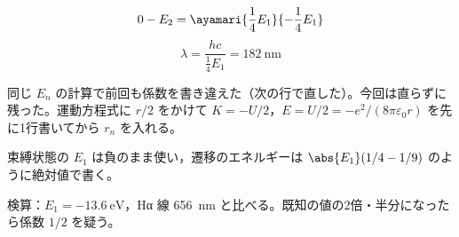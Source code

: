 \[ 0-E_{2}=\ayamari{\frac{1}{4}E_{1}}{-\frac{1}{4}E_{1}} \]
\[ \lambda=\frac{hc}{\frac{1}{4}E_{1}}=\qty{182}{\nano\metre} \]
\item {} 同じ $E_{n}$ の計算で前回も係数を書き違えた（次の行で直した）。今回は直らずに残った。運動方程式に $r/2$ をかけて $K=-U/2$，$E=U/2=-e^{2}/(8\pi\varepsilon_{0}r)$ を先に1行書いてから $r_{n}$ を入れる。
\item 束縛状態の $E_{1}$ は負のまま使い，遷移のエネルギーは $\abs{E_{1}}(1/4-1/9)$ のように絶対値で書く。
\item 検算：$E_{1}=\qty{-13.6}{\electronvolt}$，Hα 線 \qty{656}{\nano\metre} と比べる。既知の値の2倍・半分になったら係数 $1/2$ を疑う。

